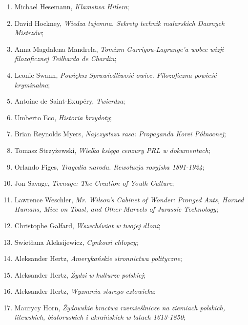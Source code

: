 \documentclass[a4paper,11pt]{article}
\begin{document}
\begin{enumerate}
\item Michael Hesemann, \textit{Kłamstwa Hitlera};

\item David Hockney, \textit{Wiedza tajemna. Sekrety technik malarskich
    Dawnych Mistrzów};

\item Anna Magdalena Mandrela, \textit{Tomizm Garrigou-Lagrange’a wobec
    wizji filozoficznej Teilharda de Chardin};

\item Leonie Swann, \textit{Powiększ Sprawiedliwość owiec. Filozoficzna
    powieść kryminalna};

\item Antoine de Saint-Exupéry, \textit{Twierdza};

\item Umberto Eco, \textit{Historia brzydoty};

\item Brian Reynolds Myers, \textit{Najczystsza rasa: Propaganda Korei
    Północnej};

\item Tomasz Strzyżewski, \textit{Wielka księga cenzury PRL w
    dokumentach};

\item Orlando Figes, \textit{Tragedia narodu. Rewolucja rosyjska
    1891-1924};

\item Jon Savage, \textit{Teenage: The Creation of Youth Culture};

\item Lawrence Weschler, \textit{Mr. Wilson's Cabinet of Wonder: Pronged
    Ants, Horned Humans, Mice on Toast, and Other Marvels of Jurassic
    Technology};

\item Christophe Galfard, \textit{Wszechświat w twojej dłoni};

\item Swietłana Aleksijewicz, \textit{Cynkowi chłopcy};

\item Aleksander Hertz, \textit{Amerykańskie stronnictwa polityczne};

\item Aleksander Hertz, \textit{Żydzi w kulturze polskiej};

\item Aleksander Hertz, \textit{Wyznania starego człowieka};

\item Maurycy Horn, \textit{Żydowskie bractwa rzemieślnicze na ziemiach
    polskich, litewskich, białoruskich i ukraińskich w latach
    1613-1850};


\end{enumerate}
\end{document}
